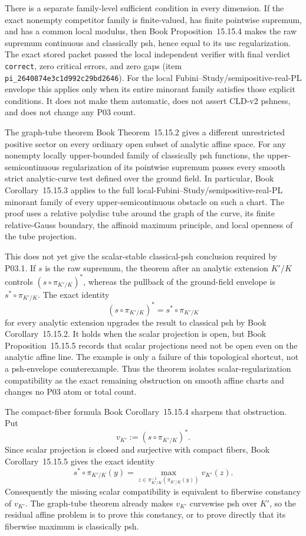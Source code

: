 \documentclass[11pt,a4paper]{article}
\theoremstyle{definition}
\theoremstyle{remark}
\begin{document}
There is a separate family-level sufficient condition in every dimension.
If the exact nonempty competitor family is finite-valued, has finite
pointwise supremum, and has a common local modulus, then
Book Proposition~15.15.4 makes the raw
supremum continuous and classically psh, hence equal to its usc
regularization.  The exact stored packet passed the local independent
verifier with final verdict \texttt{correct}, zero critical errors, and zero
gaps (item \texttt{pi\_2640874e3c1d992c29bd2646}).  For the local
Fubini--Study/semipositive-real-PL envelope this applies only when its
entire minorant family satisfies those explicit conditions.  It does not
make them automatic, does not assert CLD-v2 pshness, and does not change any
P03 count.

The graph-tube theorem
Book Theorem~15.15.2 gives a different unrestricted
positive sector on every ordinary open subset of analytic affine space.
For any nonempty locally upper-bounded family of classically psh functions,
the upper-semicontinuous regularization of its pointwise supremum passes
every smooth strict analytic-curve test defined over the ground field.  In
particular, Book Corollary~15.15.3 applies to the full
local-Fubini--Study/semipositive-real-PL minorant family of every
upper-semicontinuous obstacle on such a chart.  The proof uses a relative
polydisc tube around the graph of the curve, its finite relative-Gauss
boundary, the affinoid maximum principle, and local openness of the tube
projection.

This does not yet give the scalar-stable classical-psh conclusion required
by P03.1.  If \(s\) is the raw supremum, the theorem after an analytic
extension \(K'/K\) controls \((s\circ\pi_{K'/K})^*\), whereas the pullback of
the ground-field envelope is \(s^*\circ\pi_{K'/K}\).  The exact identity
\[
                    (s\circ\pi_{K'/K})^*
                         =s^*\circ\pi_{K'/K}
\]
for every analytic extension upgrades the result to classical psh by
Book Corollary~15.15.2.  It holds when the scalar
projection is open, but
Book Proposition~15.15.5 records that scalar projections
need not be open even on the analytic affine line.  The example is only a
failure of this topological shortcut, not a psh-envelope counterexample.
Thus the theorem isolates scalar-regularization compatibility as the exact
remaining obstruction on smooth affine charts and changes no P03 atom or
total count.

The compact-fiber formula
Book Corollary~15.15.4 sharpens that obstruction.  Put
\[
       v_{K'}:=(s\circ\pi_{K'/K})^*.
\]
Since scalar projection is closed and surjective with compact fibers,
Book Corollary~15.15.5 gives the exact identity
\[
 s^*\circ\pi_{K'/K}(y)
   =\max_{z\in\pi_{K'/K}^{-1}(\pi_{K'/K}(y))}v_{K'}(z).
\]
Consequently the missing scalar compatibility is equivalent to
fiberwise constancy of \(v_{K'}\).  The graph-tube theorem already makes
\(v_{K'}\) curvewise psh over \(K'\), so the residual affine problem is to
prove this constancy, or to prove directly that its fiberwise maximum is
classically psh.
\end{document}
